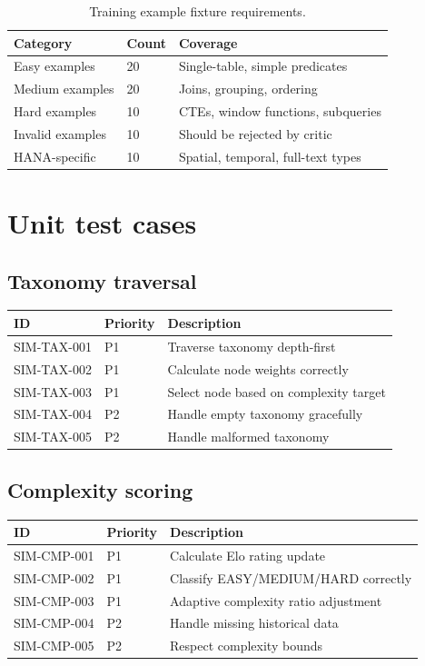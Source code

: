 \documentclass[12pt,a4paper,twoside]{report}
\begin{document}
\begin{table}[htbp]
\centering
\caption{Training example fixture requirements.}
\footnotesize
\begin{tabularx}{\linewidth}{@{}l l X@{}}
\toprule
\textbf{Category} & \textbf{Count} & \textbf{Coverage} \\ \midrule
Easy examples & 20 & Single-table, simple predicates \\
Medium examples & 20 & Joins, grouping, ordering \\
Hard examples & 10 & CTEs, window functions, subqueries \\
Invalid examples & 10 & Should be rejected by critic \\
HANA-specific & 10 & Spatial, temporal, full-text types \\
\bottomrule
\end{tabularx}
\end{table}

\section{Unit test cases}

\subsection{Taxonomy traversal}

\begin{tabularx}{\linewidth}{@{}l l X@{}}
\toprule
\textbf{ID} & \textbf{Priority} & \textbf{Description} \\ \midrule
SIM-TAX-001 & P1 & Traverse taxonomy depth-first \\
SIM-TAX-002 & P1 & Calculate node weights correctly \\
SIM-TAX-003 & P1 & Select node based on complexity target \\
SIM-TAX-004 & P2 & Handle empty taxonomy gracefully \\
SIM-TAX-005 & P2 & Handle malformed taxonomy \\
\bottomrule
\end{tabularx}

\subsection{Complexity scoring}

\begin{tabularx}{\linewidth}{@{}l l X@{}}
\toprule
\textbf{ID} & \textbf{Priority} & \textbf{Description} \\ \midrule
SIM-CMP-001 & P1 & Calculate Elo rating update \\
SIM-CMP-002 & P1 & Classify EASY/MEDIUM/HARD correctly \\
SIM-CMP-003 & P1 & Adaptive complexity ratio adjustment \\
SIM-CMP-004 & P2 & Handle missing historical data \\
SIM-CMP-005 & P2 & Respect complexity bounds \\
\bottomrule
\end{tabularx}
\end{document}

